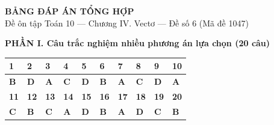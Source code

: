 \documentclass[10pt,a4paper]{article}
\begin{document}
\newpage
\pagestyle{dapan}
\setcounter{page}{1}

\begin{tcolorbox}[enhanced,colback=brandTint,colframe=brandLine,boxrule=0.7pt,arc=4pt,borderline west={3.5pt}{0pt}{brandDark},top=5pt,bottom=5pt,before skip=0pt,after skip=5pt]
  \centering
  {\Large\sffamily\bfseries\color{ink} BẢNG ĐÁP ÁN TỔNG HỢP}\\[2pt]
  {\small\sffamily\color{mutedSlate} Đề ôn tập Toán 10 — Chương IV. Vectơ — Đề số 6 (Mã đề 1047)}
\end{tcolorbox}

\noindent\textsf{\small\textbf{\color{ink}PHẦN I. Câu trắc nghiệm nhiều phương án lựa chọn (20 câu)}}
\vspace{2pt}

\begin{center}
\renewcommand{\arraystretch}{1.22}
\begin{tabular}{|C{0.95cm}|C{0.95cm}|C{0.95cm}|C{0.95cm}|C{0.95cm}|C{0.95cm}|C{0.95cm}|C{0.95cm}|C{0.95cm}|C{0.95cm}|}
\hline
{}
\color{white}\textsf{\textbf{1}} & \color{white}\textsf{\textbf{2}} & \color{white}\textsf{\textbf{3}} & \color{white}\textsf{\textbf{4}} & \color{white}\textsf{\textbf{5}} & \color{white}\textsf{\textbf{6}} & \color{white}\textsf{\textbf{7}} & \color{white}\textsf{\textbf{8}} & \color{white}\textsf{\textbf{9}} & \color{white}\textsf{\textbf{10}} \\ \hline
{}
\textbf{\color{ink}B} & \textbf{\color{ink}D} & \textbf{\color{ink}A} & \textbf{\color{ink}C} & \textbf{\color{ink}D} & \textbf{\color{ink}B} & \textbf{\color{ink}A} & \textbf{\color{ink}C} & \textbf{\color{ink}D} & \textbf{\color{ink}A} \\ \hline
{}
\color{white}\textsf{\textbf{11}} & \color{white}\textsf{\textbf{12}} & \color{white}\textsf{\textbf{13}} & \color{white}\textsf{\textbf{14}} & \color{white}\textsf{\textbf{15}} & \color{white}\textsf{\textbf{16}} & \color{white}\textsf{\textbf{17}} & \color{white}\textsf{\textbf{18}} & \color{white}\textsf{\textbf{19}} & \color{white}\textsf{\textbf{20}} \\ \hline
{}
\textbf{\color{ink}C} & \textbf{\color{ink}B} & \textbf{\color{ink}C} & \textbf{\color{ink}A} & \textbf{\color{ink}D} & \textbf{\color{ink}B} & \textbf{\color{ink}A} & \textbf{\color{ink}D} & \textbf{\color{ink}C} & \textbf{\color{ink}B} \\ \hline
\end{tabular}
\end{center}
\end{document}
